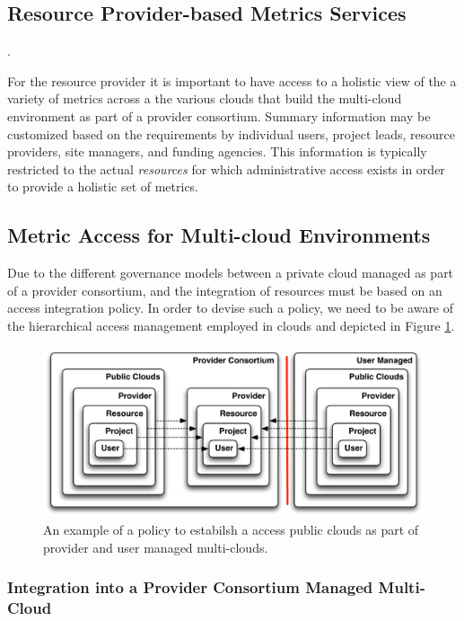 \documentclass{tex/sig-alternate}
\begin{document}
{\subsection{Resource Provider-based Metrics Services} \label{S:resource-metric}.

For the resource provider it is important to have access to a holistic
view of the a variety of metrics across a the various clouds that
build the multi-cloud environment as part of a provider consortium. 
Summary information may be customized based on the requirements by
individual users, project leads, resource providers, site managers,
and funding agencies. This information is typically restricted to the
actual {\em resources} for which administrative access exists in order
to provide a holistic set of metrics.


\subsection{Metric Access for Multi-cloud Environments} 

Due to the different governance models between a private cloud managed
as part of a provider consortium, and the integration of resources
must be based on an access integration policy. In order to devise such
a policy, we need to be aware of the hierarchical access management
employed in clouds and depicted in Figure \ref{F:metric-hierarchy}.

\begin{figure}[htb]
  \centering
    \includegraphics[width=1.0\columnwidth]{images/metric-hierarchy.pdf}
  \caption{An example of a policy to estabilsh a access public clouds as part of 
    provider and user managed multi-clouds.}
  \label{F:metric-hierarchy}
\end{figure}

\subsubsection{Integration into a Provider Consortium Managed Multi-Cloud}

}
\end{document}
